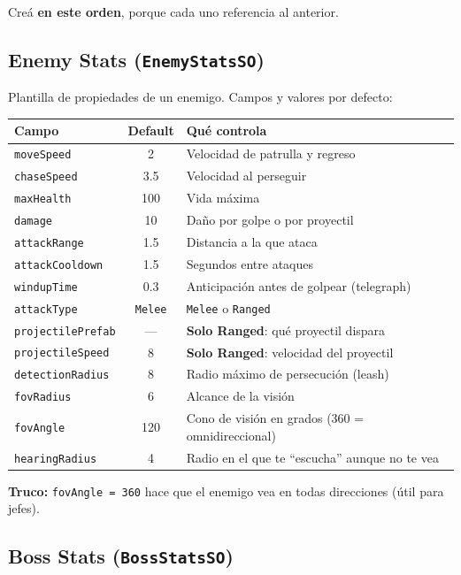 \documentclass[a4paper,12pt]{article}
\newcommand{\code}[1]{\texttt{#1}}
\begin{document}
Creá \textbf{en este orden}, porque cada uno referencia al anterior.

\subsection{Enemy Stats (\code{EnemyStatsSO})}

Plantilla de propiedades de un enemigo. Campos y valores por defecto:

\begin{center}
\begin{longtable}{|l|c|p{6.4cm}|}
\hline
\textbf{Campo} & \textbf{Default} & \textbf{Qué controla} \\
\hline
\endhead
\code{moveSpeed} & 2 & Velocidad de patrulla y regreso \\
\hline
\code{chaseSpeed} & 3.5 & Velocidad al perseguir \\
\hline
\code{maxHealth} & 100 & Vida máxima \\
\hline
\code{damage} & 10 & Daño por golpe o por proyectil \\
\hline
\code{attackRange} & 1.5 & Distancia a la que ataca \\
\hline
\code{attackCooldown} & 1.5 & Segundos entre ataques \\
\hline
\code{windupTime} & 0.3 & Anticipación antes de golpear (telegraph) \\
\hline
\code{attackType} & \code{Melee} & \code{Melee} o \code{Ranged} \\
\hline
\code{projectilePrefab} & --- & \textbf{Solo Ranged}: qué proyectil dispara \\
\hline
\code{projectileSpeed} & 8 & \textbf{Solo Ranged}: velocidad del proyectil \\
\hline
\code{detectionRadius} & 8 & Radio máximo de persecución (leash) \\
\hline
\code{fovRadius} & 6 & Alcance de la visión \\
\hline
\code{fovAngle} & 120 & Cono de visión en grados (360 = omnidireccional) \\
\hline
\code{hearingRadius} & 4 & Radio en el que te ``escucha'' aunque no te vea \\
\hline
\end{longtable}
\end{center}

\textbf{Truco:} \code{fovAngle = 360} hace que el enemigo vea en todas direcciones (útil para
jefes).

\subsection{Boss Stats (\code{BossStatsSO})}
\end{document}
